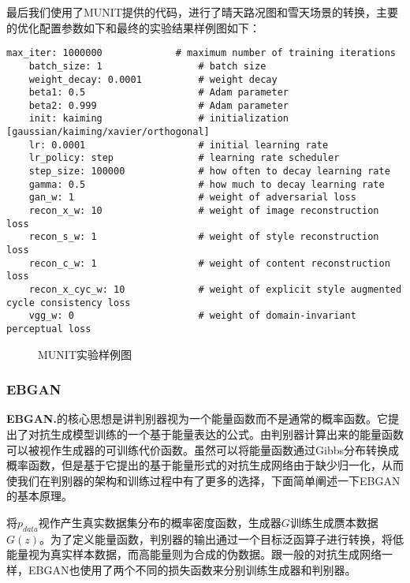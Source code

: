 最后我们使用了MUNIT提供的代码，进行了晴天路况图和雪天场景的转换，主要的优化配置参数如下和最终的实验结果样例图如下：

\begin{lstlisting}[basicstyle=\small, caption={MUNIT主要优化参数配置}, captionpos=b]
    max_iter: 1000000             # maximum number of training iterations
    batch_size: 1                 # batch size
    weight_decay: 0.0001          # weight decay
    beta1: 0.5                    # Adam parameter
    beta2: 0.999                  # Adam parameter
    init: kaiming                 # initialization [gaussian/kaiming/xavier/orthogonal]
    lr: 0.0001                    # initial learning rate
    lr_policy: step               # learning rate scheduler
    step_size: 100000             # how often to decay learning rate
    gamma: 0.5                    # how much to decay learning rate
    gan_w: 1                      # weight of adversarial loss
    recon_x_w: 10                 # weight of image reconstruction loss
    recon_s_w: 1                  # weight of style reconstruction loss
    recon_c_w: 1                  # weight of content reconstruction loss
    recon_x_cyc_w: 10             # weight of explicit style augmented cycle consistency loss
    vgg_w: 0                      # weight of domain-invariant perceptual loss
\end{lstlisting}

\begin{figure}[h]
    \caption{MUNIT实验样例图}
\end{figure}

\subsubsection[EBGAN]{EBGAN}

\textbf{EBGAN.}\cite{ebgan}\quad 的核心思想是讲判别器视为一个能量函数而不是通常的概率函数。它提出了对抗生成模型训练的一个基于能量表达的公式。由判别器计算出来的能量函数可以被视作生成器的可训练代价函数。虽然可以将能量函数通过Gibbs分布转换成概率函数，但是基于它提出的基于能量形式的对抗生成网络由于缺少归一化，从而使我们在判别器的架构和训练过程中有了更多的选择，下面简单阐述一下EBGAN的基本原理。

将$p_{data}$视作产生真实数据集分布的概率密度函数，生成器$G$训练生成赝本数据$G(z)$。为了定义能量函数，判别器的输出通过一个目标泛函算子进行转换，将低能量视为真实样本数据，而高能量则为合成的伪数据。跟一般的对抗生成网络一样，EBGAN也使用了两个不同的损失函数来分别训练生成器和判别器。

